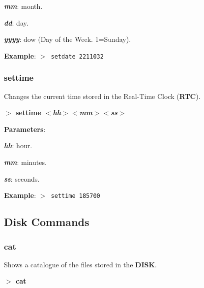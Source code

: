 \documentclass[a4paper,11pt]{article}
\begin{document}
        \hspace{1cm}\textbf{\textit{mm}}: month.

        \hspace{1cm}\textbf{\textit{dd}}: day.

        \hspace{1cm}\textbf{\textit{yyyy}}: dow (Day of the Week. 1=Sunday).

        \textbf{Example}: \texttt{$>$ setdate 2211032}

        \subsubsection{{\color{blue}settime}}
        Changes the current time stored in the Real-Time Clock (\textbf{RTC}).

        \hspace{1.9cm}\textbf{$>$ settime \textit{$<$hh$>$$<$mm$>$$<$ss$>$}}

        \textbf{Parameters}:

        \hspace{1cm}\textbf{\textit{hh}}: hour.

        \hspace{1cm}\textbf{\textit{mm}}: minutes.

        \hspace{1cm}\textbf{\textit{ss}}: seconds.

        \textbf{Example}: \texttt{$>$ settime 185700}

    \subsection{Disk Commands}\label{dskcmds}
        \subsubsection{{\color{blue}cat}}\label{cmd:cat}
        Shows a catalogue of the files stored in the \textbf{DISK}.

        \hspace{1.9cm}\textbf{$>$ cat}
\end{document}
